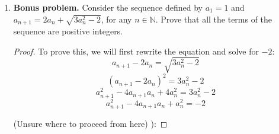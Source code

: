 \documentclass{article}
\begin{document}
\begin{enumerate}
\begin{proof}
                We can now use our previous assumption that $x_n < x_{n+1}$ to safely assume that 
                
                \[\frac{1+x_n}{2} < \frac{1+x_{n+1}}{2}\]
                \[x_{n+1} < x_{n+2}\]
                
                which thus ends our proof.
                
            \end{proof}
            
         \item \textbf{Bonus problem.} Consider the sequence defined by $a_1 = 1$ and $a_{n+1} = 2a_n + \sqrt{3a_{n}^2 - 2}$, for any $n \in \mathbb{N}$. Prove that all the terms of the sequence are positive integers.
        
            \begin{proof}
                To prove this, we will first rewrite the equation and solve for $-2$:
                \[a_{n+1} - 2a_n = \sqrt{3a_n^2 - 2}\]
                \[(a_{n+1} - 2a_n)^2 = 3a_n^2 - 2\]
                \[a_{n+1}^2 - 4a_{n+1}a_n + 4a_n^2 = 3a_n^2 - 2\]
                \[a_{n+1}^2 - 4a_{n+1}a_n + a_n^2 = -2\]
                
                (Unsure where to proceed from here) ):
            \end{proof}
            
    \end{enumerate}
\end{document}
